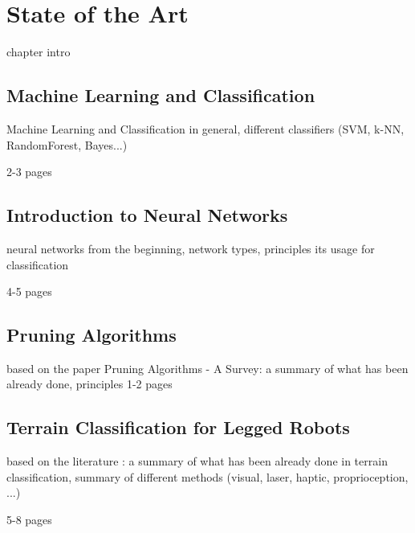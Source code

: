 \chapter{State of the Art}
\label{chapter:01:state_of_the_art}

chapter intro

\section{Machine Learning and Classification} \label{sec:machine_learning_and_classification}

Machine Learning and Classification in general, different classifiers (SVM, k-NN, RandomForest, Bayes...)

2-3 pages

\section{Introduction to Neural Networks}

neural networks from the beginning, network types, principles its usage for classification

4-5 pages

\section{Pruning Algorithms}

based on the paper Pruning Algorithms - A Survey: a summary of what has been already done, principles 
1-2 pages

\section{Terrain Classification for Legged Robots}

based on the literature : a summary of what has been already done in terrain classification, summary of different methods (visual, laser, haptic, proprioception, ...)

5-8 pages